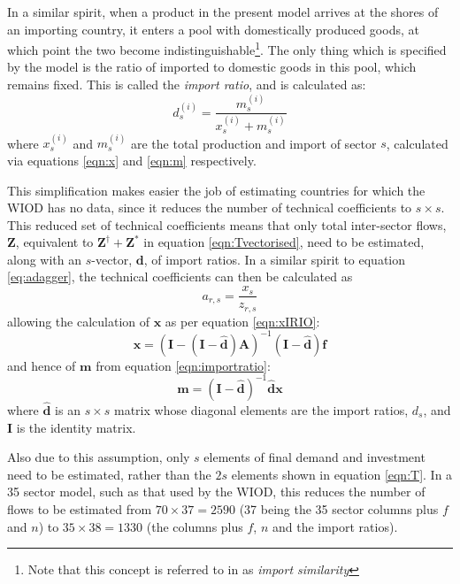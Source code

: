 \documentclass[a4paper]{article}
\begin{document}
In a similar spirit, when a product in the present model arrives at the shores of an importing country, it enters a pool with domestically produced goods, at which point the two become indistinguishable\footnote{Note that this concept is referred to in \textcite{Miller1985} as \textit{import similarity}}.
The only thing which is specified by the model is the ratio of imported to domestic goods in this pool, which remains fixed. This is called the \textit{import ratio}, and is calculated as:
\begin{equation}\label{eqn:importratio}
d_s^{(i)} = \frac{m_s^{(i)}}{x_s^{(i)} + m_s^{(i)}}
\end{equation}
where $x_s^{(i)}$ and $m_s^{(i)}$ are the total production and import of sector $s$, calculated via equations \eqref{eqn:x} and \eqref{eqn:m} respectively.

This simplification makes easier the job of estimating countries for which the WIOD has no data, since it reduces the number of technical coefficients to $s \times s$.
This reduced set of technical coefficients means that only total inter-sector flows, $\boldsymbol{Z}$, equivalent to $\boldsymbol{Z}^{\dagger} + \boldsymbol{Z}^{*}$ in equation \eqref{eqn:Tvectorised}, need to be estimated, along with an $s$-vector, $\boldsymbol{d}$, of import ratios. 
In a similar spirit to equation \eqref{eq:adagger}, the technical coefficients can then be calculated as
\begin{equation}
a_{r,s} = \frac{x_s}{z_{r,s}}
\end{equation}
allowing the calculation of $\boldsymbol{x}$ as per equation \eqref{eqn:xIRIO}:
\begin{equation}
\boldsymbol{x} = 
(\boldsymbol{I} - 
(\boldsymbol{I} - \boldsymbol{\hat{d}})
\boldsymbol{A})^{-1} 
(\boldsymbol{I} - \boldsymbol{\hat{d}})\boldsymbol{f}\label{eqn:xmodel}
\end{equation}
and hence of $\boldsymbol{m}$ from equation \eqref{eqn:importratio}:
\begin{equation}
\boldsymbol{m} = 
(\boldsymbol{I} - 
\boldsymbol{\hat{d}})^{-1} 
\boldsymbol{\hat{d}}\boldsymbol{x}\label{eqn:mmodel}
\end{equation}
where $\boldsymbol{\hat{d}}$ is an $s \times s$ matrix whose diagonal elements are the import ratios, $d_s$, and $\boldsymbol{I}$ is the identity matrix.

Also due to this assumption, only $s$ elements of final demand and investment need to be estimated, rather than the $2s$ elements shown in equation \eqref{eqn:T}.
In a 35 sector model, such as that used by the WIOD, this reduces the number of flows to be estimated from $70 \times 37 = 2590$ (37 being the 35 sector columns plus $f$ and $n$) to $35 \times 38 = 1330$ (the columns plus $f$, $n$ and the import ratios).
\end{document}
